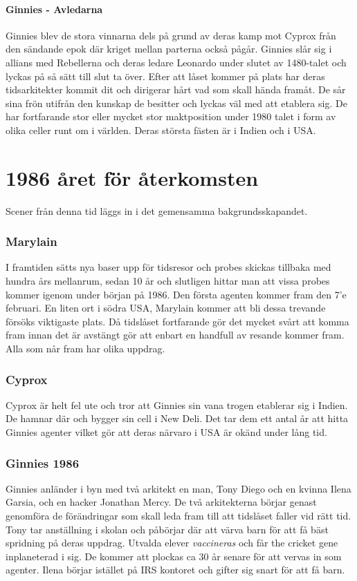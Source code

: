 \subsection{Ginnies - Avledarna}
Ginnies blev de stora vinnarna dels på grund av deras kamp mot Cyprox från den sändande epok där kriget mellan parterna också pågår. Ginnies slår sig i allians med Rebellerna och deras ledare Leonardo under slutet av 1480-talet och lyckas på så sätt till slut ta över. Efter att låset kommer på plats har deras tidsarkitekter kommit dit och dirigerar hårt vad som skall hända framåt. De sår sina frön utifrån den kunskap de besitter och lyckas väl med att etablera sig. De har fortfarande stor eller mycket stor maktposition under 1980 talet i form av olika celler runt om i världen. Deras största fästen är i Indien och i USA.
\part{1986 året för återkomsten}
Scener från denna tid läggs in i det gemensamma bakgrundsskapandet.
\section{Marylain}
I framtiden sätts nya baser upp för tidsresor och probes skickas tillbaka med hundra års mellanrum, sedan 10 år och slutligen hittar man att vissa probes kommer igenom under början på 1986. Den första agenten kommer fram den 7'e februari. En liten ort i södra USA, Marylain kommer att bli dessa trevande försöks viktigaste plats. Då tidslåset fortfarande gör det mycket svårt att komma fram innan det är avstängt gör att enbart en handfull av resande kommer fram. Alla som når fram har olika uppdrag.
\section{Cyprox}
Cyprox är helt fel ute och tror att Ginnies sin vana trogen etablerar sig i Indien. De hamnar där och bygger sin cell i New Deli. Det tar dem ett antal år att hitta Ginnies agenter vilket gör att deras närvaro i USA är okänd under lång tid.
\section{Ginnies 1986}
Ginnies anländer i byn med två arkitekt en man, Tony Diego och en kvinna Ilena Garsia, och en hacker Jonathan Mercy. De två arkitekterna börjar genast genomföra de förändringar som skall leda fram till att tidslåset faller vid rätt tid. Tony tar anställning i skolan och påbörjar där att värva barn för att få bäst spridning på deras uppdrag. Utvalda elever \textit{vaccineras} och får the cricket gene inplaneterad i sig. De kommer att plockas ca 30 år senare för att vervas in som agenter. Ilena börjar istället på IRS kontoret och gifter sig snart för att få barn.
